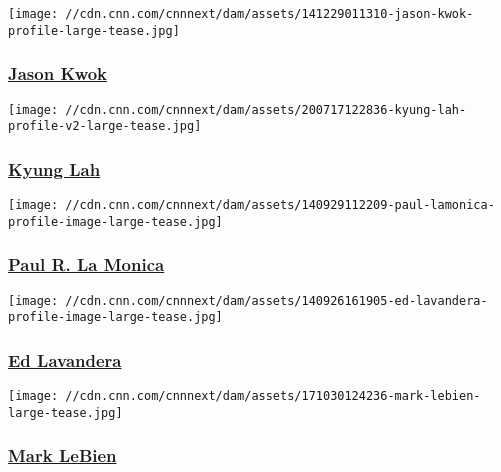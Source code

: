 \href{/profiles/jason-kwok}{}

\texttt{[image: //cdn.cnn.com/cnnnext/dam/assets/141229011310-jason-kwok-profile-large-tease.jpg]}

\hypertarget{jason-kwok}{%
\subsubsection{\texorpdfstring{\href{/profiles/jason-kwok}{Jason
Kwok}}{Jason Kwok}}\label{jason-kwok}}

\href{/profiles/kyung-lah-profile}{}

\texttt{[image: //cdn.cnn.com/cnnnext/dam/assets/200717122836-kyung-lah-profile-v2-large-tease.jpg]}

\hypertarget{kyung-lah}{%
\subsubsection{\texorpdfstring{\href{/profiles/kyung-lah-profile}{Kyung
Lah}}{Kyung Lah}}\label{kyung-lah}}

\href{/profiles/paul-r-la-monica-profile}{}

\texttt{[image: //cdn.cnn.com/cnnnext/dam/assets/140929112209-paul-lamonica-profile-image-large-tease.jpg]}

\hypertarget{paul-r-la-monica}{%
\subsubsection{\texorpdfstring{\href{/profiles/paul-r-la-monica-profile}{Paul
R. La Monica}}{Paul R. La Monica}}\label{paul-r-la-monica}}

\href{/profiles/ed-lavandera-profile}{}

\texttt{[image: //cdn.cnn.com/cnnnext/dam/assets/140926161905-ed-lavandera-profile-image-large-tease.jpg]}

\hypertarget{ed-lavandera}{%
\subsubsection{\texorpdfstring{\href{/profiles/ed-lavandera-profile}{Ed
Lavandera}}{Ed Lavandera}}\label{ed-lavandera}}

\href{/profiles/mark-lebien-profile}{}

\texttt{[image: //cdn.cnn.com/cnnnext/dam/assets/171030124236-mark-lebien-large-tease.jpg]}

\hypertarget{mark-lebien}{%
\subsubsection{\texorpdfstring{\href{/profiles/mark-lebien-profile}{Mark
LeBien}}{Mark LeBien}}\label{mark-lebien}}

